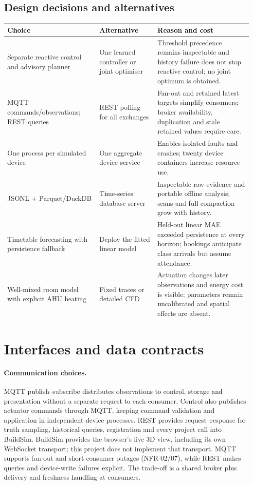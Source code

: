 \documentclass[11pt,a4paper]{article}
\begin{document}
\subsection{Design decisions and alternatives}
{\small\begin{longtable}{p{39mm}p{45mm}p{60mm}}\toprule Choice & Alternative & Reason and cost\\\midrule\endhead
Separate reactive control and advisory planner & One learned controller or joint optimiser & Threshold precedence remains inspectable and history failure does not stop reactive control; no joint optimum is obtained.\\
MQTT commands/observations; REST queries & REST polling for all exchanges & Fan-out and retained latest targets simplify consumers; broker availability, duplication and stale retained values require care.\\
One process per simulated device & One aggregate device service & Enables isolated faults and crashes; twenty device containers increase resource use.\\
JSONL + Parquet/DuckDB & Time-series database server & Inspectable raw evidence and portable offline analysis; scans and full compaction grow with history.\\
Timetable forecasting with persistence fallback & Deploy the fitted linear model & Held-out linear MAE exceeded persistence at every horizon; bookings anticipate class arrivals but assume attendance.\\
Well-mixed room model with explicit AHU heating & Fixed traces or detailed CFD & Actuation changes later observations and energy cost is visible; parameters remain uncalibrated and spatial effects are absent.\\\bottomrule\end{longtable}}

\section{Interfaces and data contracts}
\paragraph{Communication choices.}
MQTT publish--subscribe distributes observations to control, storage and presentation without a separate request to each consumer. Control also publishes actuator commands through MQTT, keeping command validation and application in independent device processes. REST provides request--response for truth sampling, historical queries, registration and every project call into BuildSim. BuildSim provides the browser's live 3D view, including its own WebSocket transport; this project does not implement that transport. MQTT supports fan-out and short consumer outages (NFR-02/07), while REST makes queries and device-write failures explicit. The trade-off is a shared broker plus delivery and freshness handling at consumers.
\end{document}
